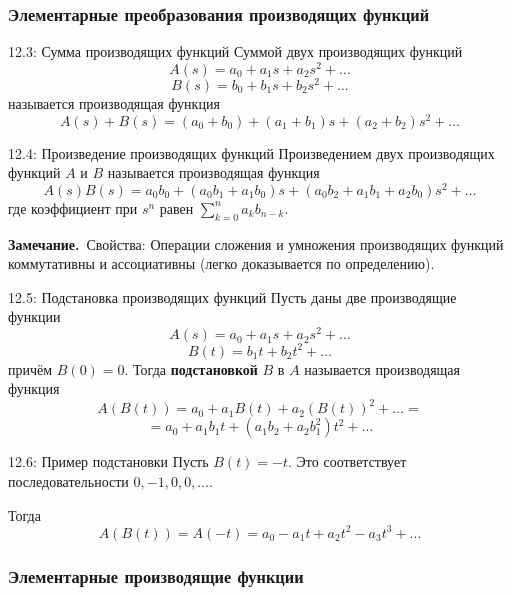 \documentclass[a4paper,12pt]{article}
\newcommand{\myremark}{\textbf{Замечание.}\ }
\begin{document}
	\subsubsection{Элементарные преобразования производящих функций}
	
	\begin{definitionbox}{12.3: Сумма производящих функций}
		Суммой двух производящих функций
		\[ A(s) = a_0 + a_1 s + a_2 s^2 + \dots \]
		\[ B(s) = b_0 + b_1 s + b_2 s^2 + \dots \]
		называется производящая функция
		\[ A(s) + B(s) = (a_0 + b_0) + (a_1 + b_1)s + (a_2 + b_2)s^2 + \dots \]
	\end{definitionbox}
	
	\begin{definitionbox}{12.4: Произведение производящих функций}
		Произведением двух производящих функций \(A\) и \(B\) называется производящая функция
		\[ A(s)B(s) = a_0b_0 + (a_0b_1 + a_1b_0)s + (a_0b_2 + a_1b_1 + a_2b_0)s^2 + \dots \]
		где коэффициент при \(s^n\) равен \(\sum_{k=0}^n a_k b_{n-k}\).
	\end{definitionbox}
	
	\myremark{Свойства:} Операции сложения и умножения производящих функций коммутативны и ассоциативны (легко доказывается по определению).
	
	\begin{definitionbox}{12.5: Подстановка производящих функций}
		Пусть даны две производящие функции
		\[ A(s) = a_0 + a_1 s + a_2 s^2 + \dots \]
		\[ B(t) = b_1 t + b_2 t^2 + \dots \]
		причём \(B(0) = 0\). Тогда \textbf{подстановкой} \(B\) в \(A\) называется производящая функция
		\[ A(B(t)) = a_0 + a_1 B(t) + a_2 (B(t))^2 + \dots = \]
		\[ = a_0 + a_1 b_1 t + (a_1 b_2 + a_2 b_1^2) t^2 + \dots \]
	\end{definitionbox}
	
	\begin{examplebox}{12.6: Пример подстановки}
		Пусть \(B(t) = -t\). Это соответствует последовательности \(0, -1, 0, 0, \dots\).
		
		Тогда
		\[ A(B(t)) = A(-t) = a_0 - a_1 t + a_2 t^2 - a_3 t^3 + \dots \]
	\end{examplebox}
	
	\subsubsection{Элементарные производящие функции}
	
\end{document}
